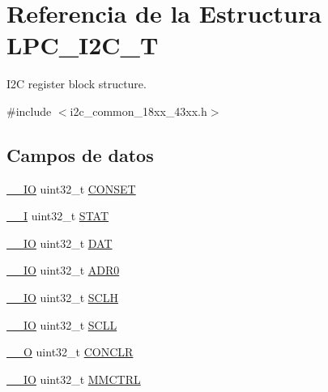 \hypertarget{struct_l_p_c___i2_c___t}{}\section{Referencia de la Estructura L\+P\+C\+\_\+\+I2\+C\+\_\+T}
\label{struct_l_p_c___i2_c___t}


I2C register block structure.  




{\ttfamily \#include $<$i2c\+\_\+common\+\_\+18xx\+\_\+43xx.\+h$>$}

\subsection*{Campos de datos}
\begin{DoxyCompactItemize}
\item 
\hyperlink{core__sc300_8h_aec43007d9998a0a0e01faede4133d6be}{\+\_\+\+\_\+\+IO} uint32\+\_\+t \hyperlink{struct_l_p_c___i2_c___t_a48a487253b2e87b303396c5082690aa2}{C\+O\+N\+S\+ET}
\item 
\hyperlink{core__sc300_8h_af63697ed9952cc71e1225efe205f6cd3}{\+\_\+\+\_\+I} uint32\+\_\+t \hyperlink{struct_l_p_c___i2_c___t_a9d37b00631f37ab3e4a127a7fee46da7}{S\+T\+AT}
\item 
\hyperlink{core__sc300_8h_aec43007d9998a0a0e01faede4133d6be}{\+\_\+\+\_\+\+IO} uint32\+\_\+t \hyperlink{struct_l_p_c___i2_c___t_a936ba4d835b77f18994c86e64b2392b1}{D\+AT}
\item 
\hyperlink{core__sc300_8h_aec43007d9998a0a0e01faede4133d6be}{\+\_\+\+\_\+\+IO} uint32\+\_\+t \hyperlink{struct_l_p_c___i2_c___t_a9270d13a7f2f6699e6850efd2da81408}{A\+D\+R0}
\item 
\hyperlink{core__sc300_8h_aec43007d9998a0a0e01faede4133d6be}{\+\_\+\+\_\+\+IO} uint32\+\_\+t \hyperlink{struct_l_p_c___i2_c___t_ac1ffb2722b08c7d2ab4545500a362577}{S\+C\+LH}
\item 
\hyperlink{core__sc300_8h_aec43007d9998a0a0e01faede4133d6be}{\+\_\+\+\_\+\+IO} uint32\+\_\+t \hyperlink{struct_l_p_c___i2_c___t_aee8ea0794273366a8a6998e45ca00929}{S\+C\+LL}
\item 
\hyperlink{core__sc300_8h_a7e25d9380f9ef903923964322e71f2f6}{\+\_\+\+\_\+O} uint32\+\_\+t \hyperlink{struct_l_p_c___i2_c___t_a7ff250ae8c92fad81187b4568ca394a3}{C\+O\+N\+C\+LR}
\item 
\hyperlink{core__sc300_8h_aec43007d9998a0a0e01faede4133d6be}{\+\_\+\+\_\+\+IO} uint32\+\_\+t \hyperlink{struct_l_p_c___i2_c___t_a7b8c95de23b4a42be73bcfe8f434b61e}{M\+M\+C\+T\+RL}

\end{DoxyCompactItemize}
